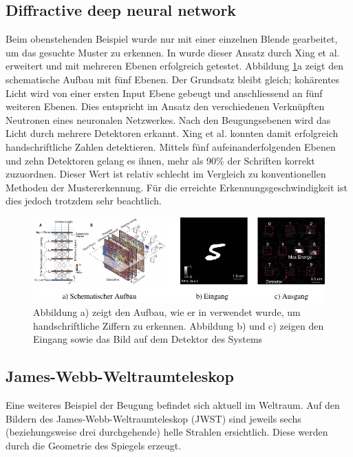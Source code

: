 \subsection{Diffractive deep neural network}
Beim obenstehenden Beispiel wurde nur mit einer einzelnen Blende gearbeitet, um das gesuchte Muster zu erkennen.
In \cite{opt:Lin.2018} wurde dieser Ansatz durch Xing et al. erweitert und mit mehreren Ebenen erfolgreich getestet.
Abbildung \ref{opt:fig:handwriting}a zeigt den schematische Aufbau mit fünf Ebenen.
Der Grundsatz bleibt gleich; kohärentes Licht wird von einer ersten Input Ebene gebeugt und anschliessend an fünf weiteren Ebenen.
Dies entspricht im Ansatz den verschiedenen Verknüpften Neutronen eines neuronalen Netzwerkes.
Nach den Beugungsebenen wird das Licht durch mehrere Detektoren erkannt.
Xing et al. konnten damit erfolgreich handschriftliche Zahlen detektieren.
Mittels fünf aufeinanderfolgenden Ebenen und zehn Detektoren gelang es ihnen, mehr als 90\% der Schriften korrekt zuzuordnen.
Dieser Wert ist relativ schlecht im Vergleich zu konventionellen Methoden der Mustererkennung.
Für die erreichte Erkennungsgeschwindigkeit ist dies jedoch trotzdem sehr beachtlich.

\begin{figure}
    \centering
    \includegraphics[width=\textwidth]{papers/opt/images/handwriting.pdf}
    \caption{Abbildung a) zeigt den Aufbau, wie er in \cite{opt:Lin.2018} verwendet wurde, um handschriftliche Ziffern zu erkennen.
    Abbildung b) und c) zeigen den Eingang sowie das Bild auf dem Detektor des Systems}
    \label{opt:fig:handwriting}
\end{figure}

\subsection{James-Webb-Weltraumteleskop}
Eine weiteres Beispiel der Beugung befindet sich aktuell im Weltraum.
Auf den Bildern des James-Webb-Weltraumteleskop (JWST) sind jeweils sechs (beziehungsweise drei durchgehende) helle Strahlen ersichtlich.
Diese werden durch die Geometrie des Spiegels erzeugt.

